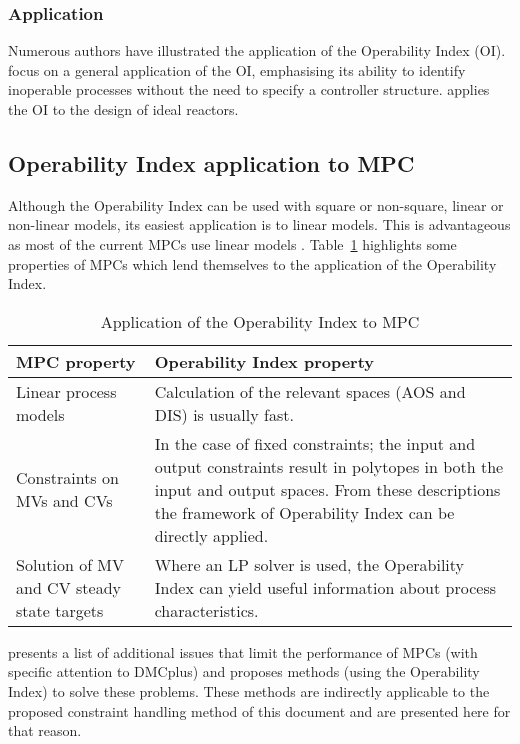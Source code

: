 \subsubsection{Application}
Numerous authors have illustrated the application of the Operability Index (OI). 
\citet{opconproc} focus on a general application of the OI, emphasising its ability to identify inoperable processes without the need to specify a controller structure. 
\citet{opidealrx} applies the OI to the design of ideal reactors. 

\subsection{Operability Index application to MPC}
Although the  Operability Index can be used with square or non-square, linear or non-linear models, its easiest application is to linear models. 
This is advantageous as most of the current MPCs use linear models \citep{vinsonphd}.
Table~\ref{tab:mpcoi} highlights some properties of MPCs which lend themselves to the  application of the Operability Index.
\begin{table}[htbp]
  \centering
  \caption[Application of the Operability Index to MPC]{Application of the
    Operability Index to MPC \citep{vinsonphd}}
  \label{tab:mpcoi}
    \begin{tabular}{p{6cm} p{9cm}}
      \toprule
      MPC property & Operability Index property \\
      \midrule
      Linear process models & Calculation of the relevant spaces (AOS and DIS) is usually fast.\\[1.3ex]
      Constraints on MVs and CVs & In the case of fixed constraints; the input and output constraints result in polytopes in both the input and output spaces. 
From these descriptions the framework of Operability Index can be directly applied.\\[1.3ex]
      Solution of MV and CV steady state targets  & Where an LP solver is used, the Operability Index can yield useful information about process characteristics.\\
      \bottomrule
    \end{tabular}
\end{table}

\citet{vinsonphd} presents a list of additional issues that limit the performance of MPCs (with specific attention to DMCplus) and proposes methods (using the Operability Index) to solve these problems. 
These methods are indirectly applicable to the proposed constraint handling method of this document and are presented here for that reason. 

